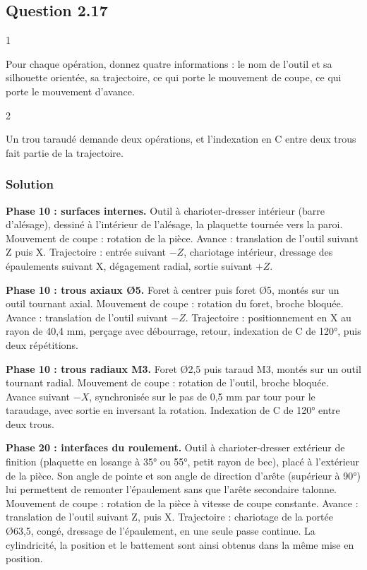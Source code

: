 \documentclass[11pt,a4paper]{article}
\begin{document}
\hypertarget{question-2.17}{%
\subsection{Question 2.17}\label{question-2.17}}

\begin{indication}{1}

Pour chaque opération, donnez quatre informations : le nom de l'outil et sa silhouette orientée, sa trajectoire, ce qui porte le mouvement de coupe, ce qui porte le mouvement d'avance.

\end{indication}

\begin{indication}{2}

Un trou taraudé demande deux opérations, et l'indexation en C entre deux trous fait partie de la trajectoire.

\end{indication}

\hypertarget{solution-30}{%
\subsubsection{Solution}\label{solution-30}}

\textbf{Phase 10 : surfaces internes.} Outil à charioter-dresser intérieur (barre d'alésage), dessiné à l'intérieur de l'alésage, la plaquette tournée vers la paroi. Mouvement de coupe : rotation de la pièce. Avance : translation de l'outil suivant Z puis X. Trajectoire : entrée suivant \(-Z\), chariotage intérieur, dressage des épaulements suivant X, dégagement radial, sortie suivant \(+Z\).

\textbf{Phase 10 : trous axiaux Ø5.} Foret à centrer puis foret Ø5, montés sur un outil tournant axial. Mouvement de coupe : rotation du foret, broche bloquée. Avance : translation de l'outil suivant \(-Z\). Trajectoire : positionnement en X au rayon de 40,4 mm, perçage avec débourrage, retour, indexation de C de 120°, puis deux répétitions.

\textbf{Phase 10 : trous radiaux M3.} Foret Ø2,5 puis taraud M3, montés sur un outil tournant radial. Mouvement de coupe : rotation de l'outil, broche bloquée. Avance suivant \(-X\), synchronisée sur le pas de 0,5 mm par tour pour le taraudage, avec sortie en inversant la rotation. Indexation de C de 120° entre deux trous.

\textbf{Phase 20 : interfaces du roulement.} Outil à charioter-dresser extérieur de finition (plaquette en losange à 35° ou 55°, petit rayon de bec), placé à l'extérieur de la pièce. Son angle de pointe et son angle de direction d'arête (supérieur à 90°) lui permettent de remonter l'épaulement sans que l'arête secondaire talonne. Mouvement de coupe : rotation de la pièce à vitesse de coupe constante. Avance : translation de l'outil suivant Z, puis X. Trajectoire : chariotage de la portée Ø63,5, congé, dressage de l'épaulement, en une seule passe continue. La cylindricité, la position et le battement sont ainsi obtenus dans la même mise en position.
\end{document}
